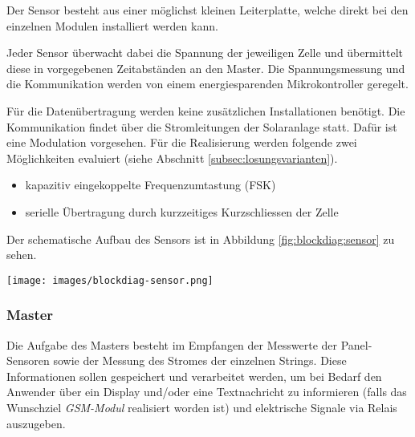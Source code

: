 \begin{minipage}[c][][t]{.49\textwidth}
	Der Sensor besteht  aus einer m\"oglichst kleinen  Leiterplatte, welche direkt
	bei den  einzelnen Modulen installiert  werden kann.

    Jeder  Sensor \"uberwacht  dabei  die Spannung  der  jeweiligen Zelle  und
    \"ubermittelt  diese in  vorgegebenen Zeitabst\"anden  an den  Master. Die
    Spannungsmessung und  die Kommunikation werden von  einem energiesparenden
    Mikrokontroller geregelt.

	F\"ur  die  Daten\"ubertragung   werden  keine  zus\"atzlichen  Installationen
	ben\"otigt. Die   Kommunikation   findet   \"uber   die   Stromleitungen   der
	Solaranlage   statt. Daf\"ur  ist   eine   Modulation  vorgesehen. F\"ur   die
	Realisierung werden  folgende zwei M\"oglichkeiten evaluiert  (siehe Abschnitt
	\ref{subsec:losungsvarianten}).

	\begin{itemize}
		\item
			kapazitiv eingekoppelte Frequenzumtastung (FSK)
		\item
			serielle \"Ubertragung durch kurzzeitiges Kurzschliessen der Zelle
	\end{itemize}

	Der     schematische    Aufbau     des     Sensors     ist    in     Abbildung
	\ref{fig:blockdiag:sensor} zu sehen.
\end{minipage}
\hspace*{0.02\textwidth}
\begin{minipage}[c][][t]{.49\textwidth}
		\centering
		\texttt{[image: images/blockdiag-sensor.png]}
		\label{fig:blockdiag:sensor}
\end{minipage}


\clearpage
\subsubsection{Master}

Die Aufgabe des Masters besteht  im Empfangen der Messwerte der Panel-Sensoren
sowie  der  Messung des  Stromes  der  einzelnen Strings. Diese  Informationen
sollen gespeichert und  verarbeitet werden, um bei Bedarf  den Anwender \"uber
ein Display und/oder  eine Textnachricht zu informieren  (falls das Wunschziel
\emph{GSM-Modul}  realisiert worden  ist) und  elektrische Signale  via Relais
auszugeben.

